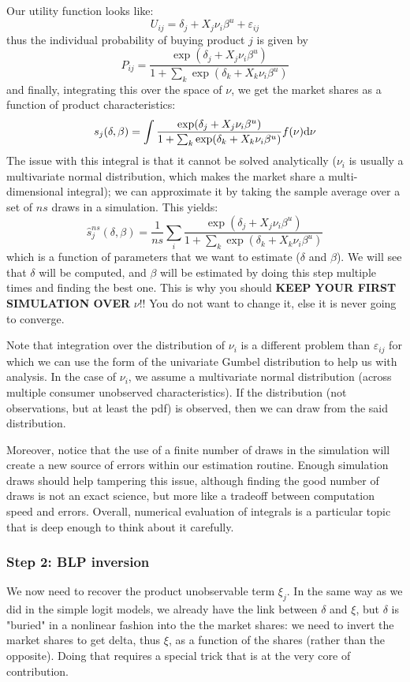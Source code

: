 Our utility function looks like: $$U_{ij} = \delta_j + X_j\nu_i\beta^u + \varepsilon_{ij} $$ thus the individual probability of buying product $j$ is given by $$P_{ij} = \frac{\exp(\delta_j + X_j\nu_i\beta^u)}{1 + \sum_k \exp(\delta_k + X_k\nu_i\beta^u) } $$ and finally, integrating this over the space of $\nu$, we get the market shares as a function of product characteristics: $$s_j(\delta, \beta) = \int \frac{\exp(\delta_j + X_j\nu_i\beta^u)}{1 + \sum_k \exp(\delta_k + X_k\nu_i\beta^u) } f(\nu) \mathrm{d}\nu $$
The issue with this integral is that it cannot be solved analytically ($\nu_i$ is usually a multivariate normal distribution, which makes the market share a multi-dimensional integral); we can approximate it by taking the sample average over a set of $ns$ draws in a simulation. This yields: $$\hat s_j^{ns}(\delta, \beta) = \frac{1}{ns} \sum_{i} \frac{\exp(\delta_j + X_j\nu_i\beta^u)}{1 + \sum_k \exp(\delta_k + X_k\nu_i\beta^u) } $$ which is a function of parameters that we want to estimate ($\delta$ and $\beta$). We will see that $\delta$ will be computed, and $\beta$ will be estimated by doing this step multiple times and finding the best one. This is why you should \textbf{KEEP YOUR FIRST SIMULATION OVER} $\nu$!! You do not want to change it, else it is never going to converge.

Note that integration over the distribution of $\nu_i$ is a different problem than $\varepsilon_{ij}$ for which we can use the form of the univariate Gumbel distribution to help us with analysis. In the case of $\nu_i$, we assume a multivariate normal distribution (across multiple consumer unobserved characteristics). If the distribution (not observations, but at least the pdf) is observed, then we can draw from the said distribution.

Moreover, notice that the use of a finite number of draws in the simulation will create a new source of errors within our estimation routine. Enough simulation draws should help tampering this issue, although finding the good number of draws is not an exact science, but more like a tradeoff between computation speed and errors. Overall, numerical evaluation of integrals is a particular topic that is deep enough to think about it carefully.

\subsubsection{Step 2: BLP inversion}

We now need to recover the product unobservable term $\xi_j$. In the same way as we did in the simple logit models, we already have the link between $\delta$ and $\xi$, but $\delta$ is "buried" in a nonlinear fashion into the the market shares: we need to invert the market shares to get delta, thus $\xi$, as a function of the shares (rather than the opposite). Doing that requires a special trick that is at the very core of\cite{blp_95} contribution.

